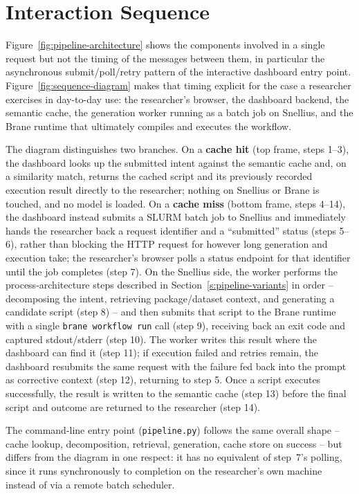 \section{Interaction Sequence}\label{s:interaction-sequence}

Figure~\ref{fig:pipeline-architecture} shows the components involved in a
single request but not the timing of the messages between them, in
particular the asynchronous submit/poll/retry pattern of the interactive
dashboard entry point. Figure~\ref{fig:sequence-diagram} makes that timing
explicit for the case a researcher exercises in day-to-day use: the
researcher's browser, the dashboard backend, the semantic cache, the
generation worker running as a batch job on Snellius, and the Brane runtime
that ultimately compiles and executes the workflow.

The diagram distinguishes two branches. On a \textbf{cache hit} (top frame,
steps 1--3), the dashboard looks up the submitted intent against the
semantic cache and, on a similarity match, returns the cached script and its
previously recorded execution result directly to the researcher; nothing on
Snellius or Brane is touched, and no model is loaded. On a \textbf{cache
miss} (bottom frame, steps 4--14), the dashboard instead submits a SLURM
batch job to Snellius and immediately hands the researcher back a request
identifier and a ``submitted'' status (steps 5--6), rather than blocking the
HTTP request for however long generation and execution take; the
researcher's browser polls a status endpoint for that identifier until the
job completes (step 7). On the Snellius side, the worker performs the
process-architecture steps described in Section~\ref{s:pipeline-variants} in
order -- decomposing the intent, retrieving package/dataset context, and
generating a candidate script (step 8) -- and then submits that script to
the Brane runtime with a single \texttt{brane workflow run} call (step 9),
receiving back an exit code and captured stdout/stderr (step 10). The worker
writes this result where the dashboard can find it (step 11); if execution
failed and retries remain, the dashboard resubmits the same request with the
failure fed back into the prompt as corrective context (step 12), returning
to step 5. Once a script executes successfully, the result is written to
the semantic cache (step 13) before the final script and outcome are
returned to the researcher (step 14).

The command-line entry point (\texttt{pipeline.py}) follows the same overall
shape -- cache lookup, decomposition, retrieval, generation, cache store on
success -- but differs from the diagram in one respect: it has no
equivalent of step~7's polling, since it runs synchronously to completion on
the researcher's own machine instead of via a remote batch scheduler.

